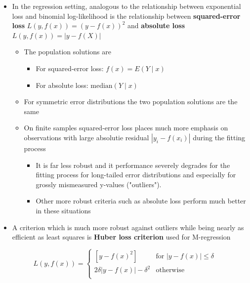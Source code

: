 \documentclass[11pt]{article}
\begin{document}
\begin{itemize}
\item In the regression setting, analogous to the relationship between exponential loss and binomial log-likelihood is the relationship between \textbf{squared-error loss} \(L(y,f(x))=(y-f(x))^2\) and \textbf{absolute loss} \(L(y,f(x)) = | y - f(X)|\)
\begin{itemize}
\item The population solutions are
\begin{itemize}
\item For squared-error loss: \(f(x)=  E(Y \mid x)\)
\item For absolute loss: \(\text{median}(Y \mid x)\)
\end{itemize}
\item For symmetric error distributions the two population solutions are the same
\item On finite samples squared-error loss places much more emphasis on observations with large absolutie residual \(|y_i - f(x_i)|\) during the fitting process
\begin{itemize}
\item It is far less robust and it performance severely degrades for the fitting process for long-tailed error distributions and especially for grossly mismeasured y-values ("outliers").
\item Other more robust criteria such as absolute loss perform much better in these situations
\end{itemize}
\end{itemize}

\item A criterion which is much more robust against outliers while being nearly as efficient as least squares is \textbf{Huber loss criterion} used for M-regression
\end{itemize}
\begin{equation}
	L(y,f(x)) = 
		\begin{cases}
			\mbox{$[y-f(x)^2]$} & \mbox{for $|y-f(x)|\leq \delta$} \\
			\mbox{$2\delta| y - f(x) | - \delta^2$} & \mbox{otherwise} \\
		\end{cases}
\end{equation}
\end{document}

